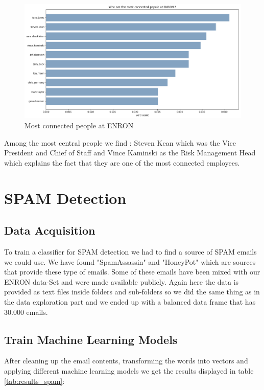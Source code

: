 \documentclass[11pt]{article}
\begin{document}
\begin{figure}[htbp]
  \centering
  \includegraphics[width=\columnwidth]{images/most_connected.png}
  \vspace{-7mm}
  \caption{Most connected people at ENRON}
  \vspace{-3mm}
  \label{fig:most_connected}
\end{figure}

Among the most central people we find : Steven Kean which was the Vice President and Chief of Staff and Vince Kaminski as the Risk Management Head \cite{employee_position} which explains the fact that they are one of the most connected employees.

\section{SPAM Detection}\label{SPAM Detection}
\subsection{Data Acquisition}
To train a classifier for SPAM detection we had to find a source of SPAM emails we could use. We have found "SpamAssassin"\cite{spamassassin} and "HoneyPot" which are sources that provide these type of emails. Some of these emails have been mixed with our ENRON data-Set and were made available publicly\cite{spamham}. Again here the data is provided as text files inside folders and sub-folders so we did the same thing as in the data exploration part and we ended up with a balanced data frame that has 30.000 emails. 
\subsection{Train Machine Learning Models}
After cleaning up the email contents, transforming the words into vectors and applying different machine learning models we get the results displayed in table \ref{tab:results_spam}:
\end{document}
